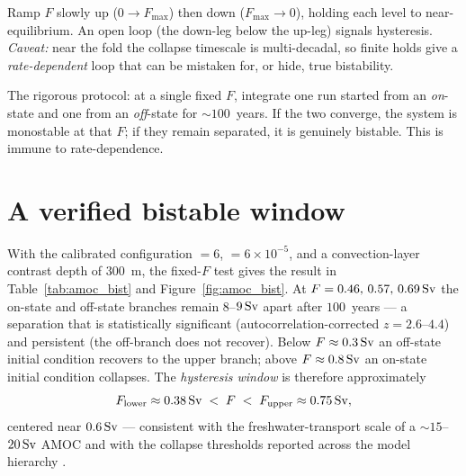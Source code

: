 \begin{description}[leftmargin=0pt,style=nextline]
  \item[Quasi-static sweep] Ramp $F$ slowly up ($0\!\to\!F_{\max}$) then down
    ($F_{\max}\!\to\!0$), holding each level to near-equilibrium. An open loop (the down-leg
    below the up-leg) signals hysteresis. \emph{Caveat:} near the fold the collapse timescale is
    multi-decadal, so finite holds give a \emph{rate-dependent} loop that can be mistaken for, or
    hide, true bistability.
  \item[Fixed-$F$ bistability test] The rigorous protocol: at a single fixed $F$, integrate one
    run started from an \emph{on}-state and one from an \emph{off}-state for $\sim100$~years. If
    the two converge, the system is monostable at that $F$; if they remain separated, it is
    genuinely bistable. This is immune to rate-dependence.
\end{description}

\section{A verified bistable window}

With the calibrated configuration $=6$, $=6\times10^{-5}$,
and a convection-layer contrast depth of $300$~m, the fixed-$F$ test gives the result in
Table~\ref{tab:amoc_bist} and Figure~\ref{fig:amoc_bist}. At $F=0.46,\,0.57,\,0.69\,\mathrm{Sv}$ the
on-state and off-state branches remain $8$--$9\,\mathrm{Sv}$ apart after $100$~years --- a separation that
is statistically significant (autocorrelation-corrected $z=2.6$--$4.4$) and persistent (the
off-branch does not recover). Below $F\approx0.3\,\mathrm{Sv}$ an off-state initial condition recovers to
the upper branch; above $F\approx0.8\,\mathrm{Sv}$ an on-state initial condition collapses. The
\emph{hysteresis window} is therefore approximately
\[
  F_{\mathrm{lower}} \approx 0.38\,\mathrm{Sv} \;<\; F \;<\; F_{\mathrm{upper}} \approx 0.75\,\mathrm{Sv},
\]
centered near $0.6\,\mathrm{Sv}$ --- consistent with the freshwater-transport scale of a $\sim15$--$20\,\mathrm{Sv}$
AMOC \citep{smeed2018} and with the collapse thresholds reported across the model hierarchy
\citep{rahmstorf2005}.

